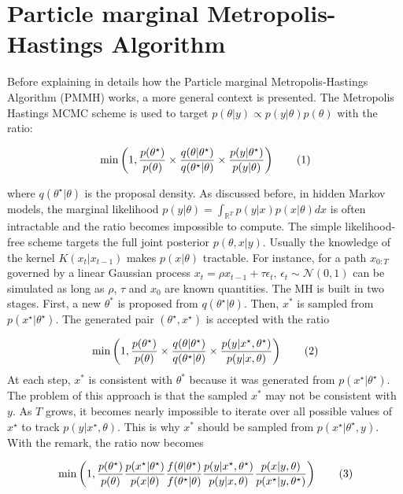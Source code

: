 \documentclass[11pt,a4,twosided,singlespacing,titlepagenumber=on]{scrreprt}
\numberwithin{equation}{chapter} %
\theoremstyle{remark}
\newcommand\numberthis{\addtocounter{equation}{1}\tag{\theequation}}
\begin{document}
\section{Particle marginal Metropolis-Hastings Algorithm}

Before explaining in details how the Particle marginal Metropolis-Hastings Algorithm (PMMH) works, a more general context is presented. The Metropolis Hastings MCMC scheme is used to target $p(\theta| y) \propto p(y|\theta)p(\theta)$ with the ratio:

\begin{align*}
\min \left( 1, \frac{p(\theta^\star)}{p(\theta)} \times  \frac{q(\theta|\theta^\star)}{q(\theta^\star|\theta)} \times \frac{p({y}|\theta^\star)}{p({y}|\theta)} \right) \numberthis
\end{align*}


where $q(\theta^\star|\theta)$ is the proposal density. As discussed before, in hidden Markov models, the marginal likelihood $p(y|\theta) = \int_{\mathbb{R}^T} p(y|x)p(x|\theta) dx$ is often intractable and the ratio becomes impossible to compute. The simple likelihood-free scheme targets the full joint posterior $p(\theta,x|y)$. Usually the knowledge of the kernel $K(x_t|x_{t-1})$ makes $p(x|\theta)$ tractable. For instance, for a path $x_{0:T}$ governed by a linear Gaussian process $x_t = \rho x_{t-1} + \tau \epsilon_t \text{, } \epsilon_t \sim \mathcal{N}(0,1)$ can be simulated as long as $\rho$, $\tau$ and $x_0$ are known quantities. The MH is built in two stages. First, a new $\theta^*$ is proposed from $q(\theta^\star|\theta)$. Then, $x^*$ is sampled from $p(x^\star|\theta^\star)$. The generated pair $(\theta^\star,x^\star)$ is accepted with the ratio

\begin{align*}
\min \left( 1, \frac{p(\theta^\star)}{p(\theta)} \times  \frac{q(\theta|\theta^\star)}{q(\theta^\star|\theta)} \times \frac{p(y|{x}^\star,\theta^\star)}{p(y|{x},\theta)} \right) \numberthis
\end{align*}
At each step, $x^*$ is consistent with $\theta^*$ because it was generated from $p(x^\star|\theta^\star)$. The problem of this approach is that the sampled $x^*$ may not be consistent with $y$. As $T$ grows, it becomes nearly impossible to iterate over all possible values of $x^\star$ to track $p(y|x^\star,\theta)$. This is why $x^*$ should be sampled from $p(x^\star|\theta^\star,y)$. With the remark, the ratio now becomes

\begin{align*}
 \min \left(1, \frac{p(\theta^\star)}{p(\theta)}   \frac{p({x}^\star|\theta^\star)}{p({x}|\theta)}   \frac{f(\theta|\theta^\star)}{f(\theta^\star|\theta)}   \frac{p(y|{x}^\star,\theta^\star)}{p(y|{x},\theta)}  \frac{p({x}|y,\theta)}{p({x}^\star|y,\theta^\star)} \right) \numberthis
\end{align*}
\end{document}
